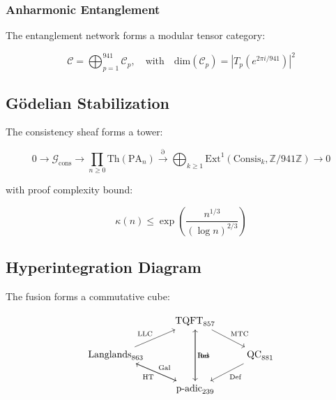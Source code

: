 \documentclass[12pt]{article}
\begin{document}
\subsubsection{Anharmonic Entanglement}
The entanglement network forms a modular tensor category:

\begin{equation}
\mathcal{C} = \bigoplus_{p=1}^{941} \mathcal{C}_p, \quad \text{with} \quad \text{dim}(\mathcal{C}_p) = |T_p(e^{2\pi i/941})|^2
\end{equation}

\begin{algorithm}[H]
\caption{Spectral Prime Expansion}
\begin{algorithmic}[1]
\STATE Initialize $\Psi_0$ with $\langle \Omega, \Psi_0 \rangle = 1$
$}
\STATE Compute $\gamma_n = \frac{1}{2\pi i}\int_{\Re(s)=1/2} \frac{\Lambda'(s)}{\Lambda(s)} \Psi_{n-1}(s) ds$
\STATE Update $\Psi_n = \sum_{\rho} e^{i\text{Im}(\rho)t} \text{Res}_{s=\rho}\Lambda(s)$
\ENDFOR
\end{algorithmic}
\end{algorithm}

\subsection{Gödelian Stabilization}
The consistency sheaf forms a tower:

\begin{equation}
0 \to \mathscr{G}_{\text{cons}} \to \prod_{n\geq0} \text{Th}(\text{PA}_n) \xrightarrow{\partial} \bigoplus_{k\geq1} \text{Ext}^1(\text{Consis}_k, \mathbb{Z}/941\mathbb{Z}) \to 0
\end{equation}

with proof complexity bound:

\begin{equation}
\kappa(n) \leq \exp\left(\frac{n^{1/3}}{(\log n)^{2/3}}\right)
\end{equation}

\subsection{Hyperintegration Diagram}
The fusion forms a commutative cube:

\begin{equation}
\begin{tikzcd}
& \text{TQFT}_{857} \arrow[dr,"\text{MTC}"] \arrow[dd,"\text{Res}"] & \\
\text{Langlands}_{863} \arrow[ur,"\text{LLC}"] \arrow[dr,"\text{Gal}"] & & \text{QC}_{881} \arrow[dl,"\text{Def}"] \\
& \text{p-adic}_{239} \arrow[ul,"\text{HT}"] \arrow[uu,"\text{Ind}"'] & 
\end{tikzcd}
\end{equation}
\end{document}

